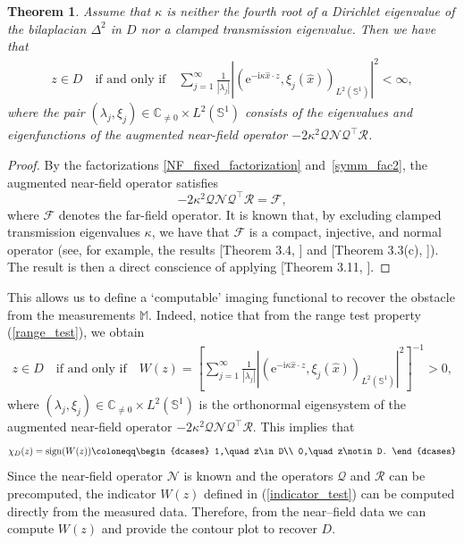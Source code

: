 \documentclass{article}
\newtheorem{Theorem}{Theorem}[section]
\begin{document}
\begin{Theorem}\label{THM_FM_NF_data}
    Assume that $\kappa$ is neither the fourth root of a Dirichlet eigenvalue of the bilaplacian $\Delta^2$ in $D$ nor a clamped transmission eigenvalue. Then we have that
    \begin{align}\label{range_test}
        z\in D\quad \text{if and only if}\quad \sum_{j=1}^\infty \frac{1}{|\lambda_j|}\left|\left(\mathrm e^{-\mathrm i\kappa \hat x\cdot z},\xi_j (\hat{x})\right)_{L^2(\mathbb S^1)}\right|^2<\infty,
    \end{align}
    where the pair $(\lambda_j, \xi_j)\in \mathbb C_{\neq 0}\times L^2(\mathbb S^1)$ consists of the eigenvalues and eigenfunctions of the augmented near-field operator $-2\kappa^2\mathcal Q\mathcal N\mathcal Q^\top \mathcal R$.
\end{Theorem}
\begin{proof}
By the factorizations \eqref{NF_fixed_factorization} and~\eqref{symm_fac2}, the augmented near-field operator satisfies
\begin{equation}\label{idenity}
-2\kappa^2\mathcal Q\mathcal N\mathcal Q^\top\mathcal R
=\mathcal F,
\end{equation}
where $\mathcal F$ denotes the far-field operator. It is known that, by excluding clamped transmission eigenvalues $\kappa$, we have that $\mathcal F$ is a compact, injective, and normal operator (see, for example, the results [Theorem 3.4, \cite{HarrisLeeLi2025}] and [Theorem 3.3(c), \cite{Zhu2026}]). The result is then a direct conscience of applying [Theorem 3.11, \cite{Zhu2026}]. 
\end{proof}
 This allows us to define a `computable' imaging functional to recover the obstacle from the measurements $\mathbb{M}$. Indeed, notice that from the range test property (\ref{range_test}), we obtain
\begin{align}\label{indicator_test}
    z\in D\quad \text{if and only if}\quad W(z)=\left[\sum_{j=1}^\infty \frac{1}{|\lambda_j|}\left|\left(\mathrm e^{-\mathrm i\kappa \hat x\cdot z},\xi_j (\hat{x})\right)_{L^2(\mathbb S^1)}\right|^2\right]^{-1}>0,
\end{align}
where $(\lambda_j, \xi_j)\in \mathbb C_{\neq 0}\times L^2(\mathbb S^1)$ is the orthonormal eigensystem of the augmented near-field operator $-2\kappa^2\mathcal Q\mathcal N\mathcal Q^\top \mathcal R$. This implies that 
\[
\chi_D(z)=\text{sign}(W(z))\coloneqq \begin{dcases}
    1,\quad z\in D\\
    0,\quad z\notin D.
\end{dcases}
\]
Since the near-field operator $\mathcal N$ is known and the operators $\mathcal Q$ and $\mathcal R$ can be precomputed, the indicator $W(z)$ defined in (\ref{indicator_test}) can be computed directly from the measured data. Therefore, from the near–field data we can
compute $W(z)$ and provide the contour plot to recover $D$.
\end{document}
